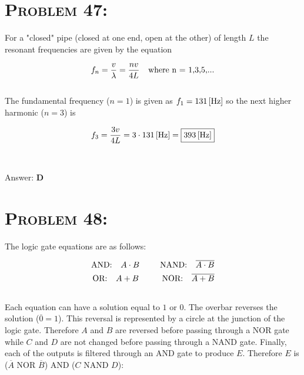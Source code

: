 \documentclass{article}
\begin{document}

\section{\textsc{Problem 47:}} For a "closed" pipe (closed at one end, open at the other) of length $L$  the resonant frequencies are given by the equation

\begin{align}
f_{n} = \frac{v}{\lambda} = \frac{n v}{4L} \text{\hspace{.1 in} where n = 1,3,5,...}
\end{align}
\\
The fundamental frequency ($n = 1$) is given as $f_{1} = \unit[131]{[Hz]}$ so the next higher harmonic ($n = 3$) is

\begin{align}
f_{3} = \frac{3 v}{4L} = 3 \cdot  \unit[131]{[Hz]} = \boxed{\unit[393]{[Hz]}}
\end{align}
\\\\
Answer: \textbf{\textcolor{ProcessBlue}D}\\


\section{\textsc{Problem 48:}} The logic gate equations are as follows:

\begin{align}
\text{AND: \hspace{.1 in}} A \cdot B \text{\hspace{.3 in} NAND: \hspace{.1 in}} \overline{A \cdot B} \\
\text{OR: \hspace{.1 in}} A + B \text{ \hspace{.3 in} NOR: \hspace{.1 in}} \overline{A + B}
\end{align}
\\
Each equation can have a solution equal to $1$ or $0$. The overbar reverses the solution ($\overline{0} = 1$). This reversal is represented by a circle at the junction of the logic gate. Therefore $A$ and $B$ are reversed before passing through a NOR gate while $C$ and $D$ are not changed before passing through a NAND gate. Finally, each of the outputs is filtered through an AND gate to produce $E$. Therefore $E$ is ($\overline{A}$ NOR $\overline{B}$) AND ($C$ NAND $D$):
\end{document}
